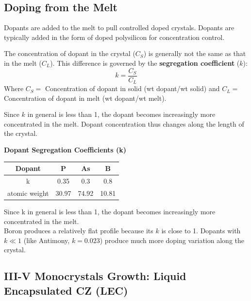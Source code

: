 \documentclass{report}
\begin{document}
\subsection{Doping from the Melt}
Dopants are added to the melt to pull controlled doped crystals. Dopants are typically added in the form of doped polysilicon for concentration control.

The concentration of dopant in the crystal ($C_{S}$) is generally not the same as that in the melt ($C_{L}$). This difference is governed by the \textbf{segregation coefficient} ($k$):
$$k=\frac{C_{S}}{C_{L}}$$
Where $C_{S}=$ Concentration of dopant in solid (wt dopant/wt solid) and $C_{L}=$ Concentration of dopant in melt (wt dopant/wt melt).

Since $k$ in general is less than 1, the dopant becomes increasingly more concentrated in the melt. Dopant concentration thus changes along the length of the crystal.

\begin{center}
\textbf{Dopant Segregation Coefficients (k)}
\begin{tabular}{|c|c|c|c|}
\hline
Dopant & P & As & B \\
\hline
k & 0.35 & 0.3 & 0.8 \\
\hline
atomic weight & 30.97 & 74.92 & 10.81 \\
\hline
\end{tabular}
\end{center}
Since k in general is less than 1,
the dopant becomes increasingly
more concentrated in the melt.\\
Boron produces a relatively flat profile because its $k$ is close to 1. Dopants with $k\ll1$ (like Antimony, $k=0.023$) produce much more doping variation along the crystal.

\subsection{III-V Monocrystals Growth: Liquid Encapsulated CZ (LEC)}
\end{document}
